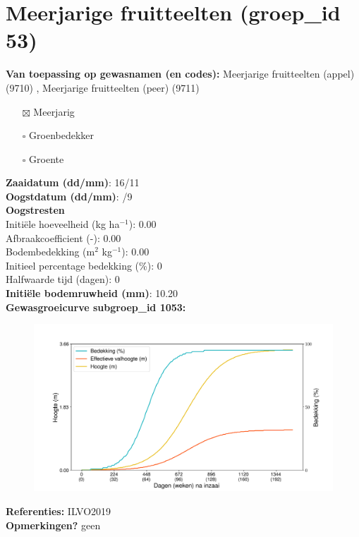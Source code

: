 \documentclass{article}
\begin{document}
 \section{Meerjarige fruitteelten (groep\_id 53)} 
 \textbf{Van toepassing op gewasnamen (en codes):} Meerjarige fruitteelten (appel) (9710) , Meerjarige fruitteelten (peer) (9711) 
 \begin{multicols}{3} \begin{itemize} \item[$\boxtimes$] Meerjarig \item[$\square$] Groenbedekker \item[$\square$] Groente \end{itemize} \end{multicols} 
  \textbf{Zaaidatum (dd/mm)}: 16/11  \vspace{0.10cm} \\ 
  \textbf{Oogstdatum (dd/mm)}: /9  \vspace{0.10cm} \\ 
  \textbf{Oogstresten} \vspace{0.05cm} \\ 
  \tab Initi\"{e}le hoeveelheid (kg ha$^{-1}$): 0.00 \vspace{0.05cm} \\ 
  \tab Afbraakcoefficient (-): 0.00 \vspace{0.05cm} \\ 
  \tab Bodembedekking (m$^2$ kg$^{-1}$): 0.00 \vspace{0.05cm} \\ 
  \tab Initieel percentage bedekking (\%): 0 \vspace{0.05cm} \\ 
  \tab Halfwaarde tijd (dagen): 0 \vspace{0.05cm} \\ 
  \textbf{Initi\"{e}le bodemruwheid (mm)}: 10.20 \vspace{0.05cm} \\ 
  \textbf{Gewasgroeicurve subgroep\_id 1053:} 
 \begin{center} \begin{figure}[H] \includegraphics[width=12.5cm]{temp/1053.png} \end{figure} \end{center} 
  \textbf{Referenties:} ILVO2019 \vspace{0.10cm} \\ 
  \textbf{Opmerkingen?} geen \vspace{0.10cm} \\ 
 \newpage 
\end{document}
